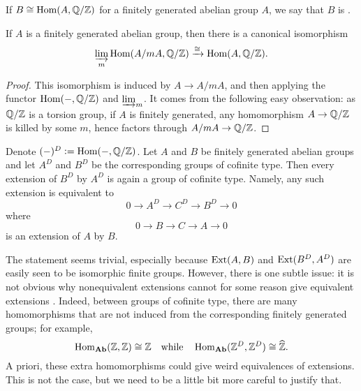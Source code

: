 \begin{definition}
  If $B \cong \operatorname{Hom} (A, \mathbb{Q}/\mathbb{Z})$ for a finitely generated abelian group $A$,
  we say that $B$ is .
\end{definition}

\begin{observation}
  \label{obs:fg-group-and-Hom-Q-Z}
  If $A$ is a finitely generated abelian group, then there is a canonical
  isomorphism
  $$\varinjlim_m \operatorname{Hom} (A/m A, \mathbb{Q}/\mathbb{Z}) \xrightarrow{\cong} \operatorname{Hom} (A,\mathbb{Q}/\mathbb{Z}).$$

  \begin{proof}
    This isomorphism is induced by $A \to A/m A$, and then applying the functor
    $\operatorname{Hom} (-, \mathbb{Q}/\mathbb{Z})$ and $\varinjlim_m$. It comes from the following easy
    observation: as $\mathbb{Q}/\mathbb{Z}$ is a torsion group, if $A$ is finitely generated,
    any homomorphism $A\to \mathbb{Q}/\mathbb{Z}$ is killed by some $m$, hence factors through
    $A/mA \to \mathbb{Q}/\mathbb{Z}$.
  \end{proof}
\end{observation}

\begin{lemma}
  \label{lemma:extensions-of-cofinite-type-groups}
  Denote $(-)^D \mathrel{\mathop:}= \operatorname{Hom} (-,\mathbb{Q}/\mathbb{Z})$. Let $A$ and $B$ be finitely generated
  abelian groups and let $A^D$ and $B^D$ be the corresponding groups of cofinite
  type. Then every extension of $B^D$ by $A^D$ is again a group of cofinite
  type. Namely, any such extension is equivalent to
  \begin{equation}
    \label{eqn:extn-AD-by-BD}
    0 \to A^D \to C^D \to B^D \to 0
  \end{equation}
  where
  \begin{equation}
    \label{eqn:extn-B-by-A}
    0 \to B \to C \to A \to 0
  \end{equation}
  is an extension of $A$ by $B$.
\end{lemma}

The statement seems trivial, especially because $\operatorname{Ext} (A,B)$ and
$\operatorname{Ext} (B^D,A^D)$ are easily seen to be isomorphic finite groups. However, there
is one subtle issue: it is not obvious why nonequivalent extensions
 cannot for some reason give equivalent extensions
. Indeed, between groups of cofinite type, there are
many homomorphisms that are not induced from the corresponding finitely
generated groups; for example,
\begin{equation}
  \label{eqn:D-not-full}
  \operatorname{Hom}_{\text{\bf Ab}} (\mathbb{Z},\mathbb{Z}) \cong \mathbb{Z}
  \quad\text{while}\quad
  \operatorname{Hom}_{\text{\bf Ab}} (\mathbb{Z}^D, \mathbb{Z}^D) \cong \widehat{\mathbb{Z}}.
\end{equation}
A priori, these extra homomorphisms could give weird equivalences of
extensions. This is not the case, but we need to be a little bit more careful to
justify that.

